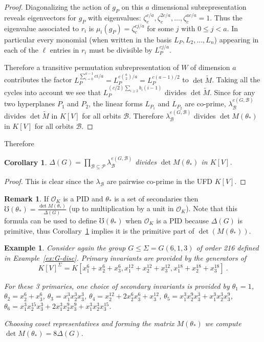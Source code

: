 \documentclass[12pt]{amsart}
\providecommand{\binom}[2]{{#1\choose#2}}
\renewcommand{\geq}{\geqslant}
\renewcommand{\leq}{\leqslant}
\newcommand{\KK}{K}
\newcommand{\OK}{{{\mathcal O}_K}}
\newtheorem{cor}[thm]{Corollary}
\newtheorem{example}[thm]{Example}
\theoremstyle{definition}
\newtheorem{remark}[thm]{Remark}
\newcommand{\calb}{\mathcal{B}}
\newcommand{\calp}{\mathcal{P}}
\newcommand{\bth}{{{\theta_*}}} %
\begin{document}
\begin{proof}
  Diagonalizing the action of $g_P$ on this $a$ dimensional subrepresentation reveals eigenvectors for $g_P$
 with eigenvalues: $\zeta_{c}^{c/a}, \zeta_{c}^{2c/a},\dots,\zeta_{c}^{ac/a}=1$.
Thus the eigenvalue associated to $r_i$ is
$\mu_i(g_P)=\zeta_c^{cj/a}$ for some $j$ with
$0 \leq j < a$.  
In particular every monomial (when written in the basis $L_P, L_2,\dots, L_n$) appearing in 
each of the $\ell$ entries in $r_i$ must be divisible by $L_P^{c j/a}$.

Therefore a transitive permutation subrepresentation of $W$ of dimension $a$ 
contributes the factor 
$L_P^{\sum_{i=0}^{a-1} c i/a} = L_P^{c\binom{a}{2}/a}=L_P^{c(a-1)/2}$ to $\det \widetilde{M}$. 
 Taking all the cycles into account we see that
 $L_P^{(c/2)\sum_{i \geq 2} b_i(i-1)}$ divides 
 $\det \widetilde{M}$.
 Since for any two hyperplanes $P_1$ and $P_2$, the linear forms
 $L_{P_1}$ and $L_{P_2}$ are co-prime,  
  $\lambda_\calb^{e(G,\calb)}$ divides $\det \widetilde{M}$ in $\KK[V]$ for all orbits $\calb$.
  Therefore $\lambda_\calb^{e(G,\calb)}$ divides 
  $\det M(\bth)$ in $\KK[V]$ for all orbits $\calb$.
\end{proof}
  
Therefore
\begin{cor}\label{cor: main equation}
  $\Delta(G) = \prod_{\calb \subseteq \calp} \lambda_\calb^{e(G,\calb)}$ 
  divides $\det M(\bth)$ in $\KK[V]$.  
\end{cor}
%
\begin{proof}
This is clear since the $\lambda_\calb$ are pairwise co-prime in the UFD $K[V]$.  
\end{proof}   


\begin{remark}
  If $\OK$ is a PID and $\bth$ is a set of secondaries 
  then $\mho(\bth) = \frac{\det M(\bth)}{\Delta(G)}$
   (up to multiplication by a unit in $\OK$). Note that this formula can be used to define $\mho(\bth)$ when $\OK$ is a PID because $\Delta(G)$ is primitive, thus Corollary~\ref{cor: main equation} implies it is the primitive part of $\det(M(\bth))$.
\end{remark}



\begin{example}\label{ex:G(2,2,n)}
Consider again the group $G \leq \Sigma = G(6,1,3)$ of order 216 defined in Example~\ref{ex:G-disc}.
Primary invariants are provided by the generators of 
$$K[V]^\Sigma = 
K[x_1^6 + x_2^6 + x_3^6,
x_1^{12} + x_2^{12} + x_3^{12},
x_1^{18} + x_2^{18} + x_3^{18}]\ .$$

For these 3 primaries, one choice of secondary invariants is provided by
$\theta_1 = 1$,
$\theta_2 = x_2^6 + x_3^6$,
$\theta_3 = x_1^3 x_2^3 x_3^3$,
$\theta_4 = x_2 ^{12} + 2 x_2^6 x_3^6 + x_3 ^{12}$,
$\theta_5 = x_1^3 x_2^9 x_3^3 + x_1^3 x_2^3 x_3^9$,
$\theta_6 = x_1^3 x_2 ^{15} x_3^3 + 2 x_1^3 x_2^9 x_3^9 
+ x_1^3 x_2^3 x_3^{15}$.

Choosing  coset representatives and forming
the matrix $M(\theta_*)$ we compute
$\det M(\theta_*) = 8 \Delta(G)$.
\end{example}
\end{document}
